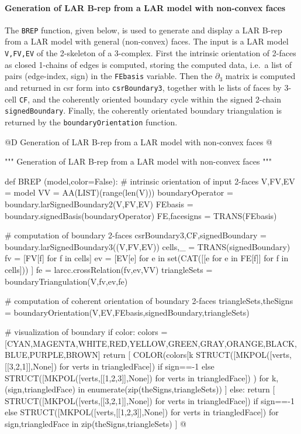 \documentclass[11pt,oneside]{article}    %
\begin{document}
\paragraph{Generation of LAR B-rep from a LAR model with non-convex faces}

The \texttt{BREP} function, given below, is used to generate and display a  LAR B-rep from a LAR model with general (non-convex) faces. The input is a LAR model \texttt{V,FV,EV} of the 2-skeleton of a 3-complex. First the intrinsic orientation of 2-faces as closed 1-chains of edges is computed,  storing the computed data, i.e.~a list of pairs (edge-index, sign) in the \texttt{FEbasis} variable. Then the $\partial_3$ matrix is computed and returned in csr form into \texttt{csrBoundary3}, together with le lists of faces by 3-cell \texttt{CF}, and the coherently oriented boundary cycle within the signed 2-chain \texttt{signedBoundary}. Finally, the coherently orientated boundary triangulation is returned by the \texttt{boundaryOrientation} function.

@D Generation of LAR B-rep from a LAR model with non-convex faces
@{""" Generation of LAR B-rep from a LAR model with non-convex faces """

def BREP (model,color=False):
    # intrinsic orientation of input 2-faces
    V,FV,EV = model
    VV = AA(LIST)(range(len(V)))
    boundaryOperator = boundary.larSignedBoundary2(V,FV,EV)
    FEbasis = boundary.signedBasis(boundaryOperator)
    FE,facesigns = TRANS(FEbasis)
    
    # computation of boundary 2-faces
    csrBoundary3,CF,signedBoundary = boundary.larSignedBoundary3((V,FV,EV))
    cells,_ = TRANS(signedBoundary)
    fv = [FV[f] for f in cells]
    ev = [EV[e] for e in set(CAT([[e for e in FE[f]] for f in cells])) ]
    fe = larcc.crossRelation(fv,ev,VV)
    triangleSets = boundaryTriangulation(V,fv,ev,fe) 
    
    # computation of coherent orientation of boundary 2-faces
    triangleSets,theSigns = boundaryOrientation(V,EV,FEbasis,signedBoundary,triangleSets)

    # visualization of boundary
    if color:
        colors = [CYAN,MAGENTA,WHITE,RED,YELLOW,GREEN,GRAY,ORANGE,BLACK,BLUE,PURPLE,BROWN]
        return [ COLOR(colors[k%
                 STRUCT([MKPOL([verts,[[3,2,1]],None]) for verts in triangledFace])
        		 if sign==-1 else 
        		 STRUCT([MKPOL([verts,[[1,2,3]],None])  for verts in triangledFace])
                 ) 
        for k,(sign,triangledFace) in enumerate(zip(theSigns,triangleSets)) ]
    else:
        return [ STRUCT([MKPOL([verts,[[3,2,1]],None])  for verts in triangledFace])
        		 if sign==-1 else 
        		 STRUCT([MKPOL([verts,[[1,2,3]],None])  for verts in triangledFace])
        for sign,triangledFace in zip(theSigns,triangleSets) ]
@}
\end{document}
